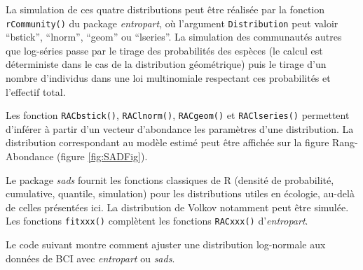 \documentclass[
  11pt,
  french,
  a4paper,
  extrafontsizes,onecolumn,openright
  ]{memoir}
\newenvironment{Shaded}{\begin{snugshade}}{\end{snugshade}}
\newcommand{\DataTypeTok}[1]{\textcolor[rgb]{0.13,0.29,0.53}{#1}}
\newcommand{\FloatTok}[1]{\textcolor[rgb]{0.00,0.00,0.81}{#1}}
\newcommand{\KeywordTok}[1]{\textcolor[rgb]{0.13,0.29,0.53}{\textbf{#1}}}
\newcommand{\NormalTok}[1]{#1}
\newcommand{\OperatorTok}[1]{\textcolor[rgb]{0.81,0.36,0.00}{\textbf{#1}}}
\newcommand{\OtherTok}[1]{\textcolor[rgb]{0.56,0.35,0.01}{#1}}
\newcommand{\StringTok}[1]{\textcolor[rgb]{0.31,0.60,0.02}{#1}}
\begin{document}
\begin{Shaded}
\end{Shaded}

\normalsize

La simulation de ces quatre distributions peut être réalisée par la fonction \texttt{rCommunity()} du package \emph{entropart}, où l'argument \texttt{Distribution} peut valoir \enquote{bstick}, \enquote{lnorm}, \enquote{geom} ou \enquote{lseries}.
La simulation des communautés autres que log-séries passe par le tirage des probabilités des espèces (le calcul est déterministe dans le cas de la distribution géométrique) puis le tirage d'un nombre d'individus dans une loi multinomiale respectant ces probabilités et l'effectif total.

Les fonction \texttt{RACbstick()}, \texttt{RAClnorm()}, \texttt{RACgeom()} et \texttt{RAClseries()} permettent d'inférer à partir d'un vecteur d'abondance les paramètres d'une distribution.
La distribution correspondant au modèle estimé peut être affichée sur la figure Rang-Abondance (figure \ref{fig:SADFig}).

Le package \emph{sads} fournit les fonctions classiques de R (densité de probabilité, cumulative, quantile, simulation) pour les distributions utiles en écologie, au-delà de celles présentées ici.
La distribution de Volkov notamment peut être simulée.
Les fonctions \texttt{fitxxx()} complètent les fonctions \texttt{RACxxx()} d'\emph{entropart}.

Le code suivant montre comment ajuster une distribution log-normale aux données de BCI avec \emph{entropart} ou \emph{sads}.
\end{document}
